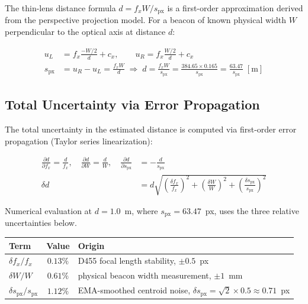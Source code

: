 The thin-lens distance formula $d = f_x W/s_{\text{px}}$ is a first-order approximation derived from the perspective projection model. For a beacon of known physical width $W$ perpendicular to the optical axis at distance $d$:

\begin{eqblock}
\begin{align}
u_L &= f_x \frac{-W/2}{d} + c_x, \qquad u_R = f_x \frac{W/2}{d} + c_x \\
s_{\text{px}} &= u_R - u_L = \frac{f_x W}{d} \;\Rightarrow\; d = \frac{f_x W}{s_{\text{px}}} = \frac{384.65 \times 0.165}{s_{\text{px}}} = \frac{63.47}{s_{\text{px}}} \; [\text{m}]
\end{align}
\end{eqblock}

\subsection{Total Uncertainty via Error Propagation}

The total uncertainty in the estimated distance is computed via first-order error propagation (Taylor series linearization):

\begin{eqblock}
\begin{align}
\frac{\partial d}{\partial f_x} = \frac{d}{f_x}, \quad
\frac{\partial d}{\partial W} = \frac{d}{W}, \quad
\frac{\partial d}{\partial s_{\text{px}}} &= -\frac{d}{s_{\text{px}}} \\
\delta d &= d\sqrt{\left(\frac{\delta f_x}{f_x}\right)^2 + \left(\frac{\delta W}{W}\right)^2 + \left(\frac{\delta s_{\text{px}}}{s_{\text{px}}}\right)^2}
\end{align}
\end{eqblock}

Numerical evaluation at $d=1.0$~m, where $s_{\text{px}}=63.47$~px, uses the
three relative uncertainties below.

\begin{center}
\small
\begin{tabular}{@{}lcl@{}}
\toprule
Term & Value & Origin \\
\midrule
$\delta f_x/f_x$ & $0.13\%$ & D455 focal length stability, $\pm0.5$~px \\
$\delta W/W$ & $0.61\%$ & physical beacon width measurement, $\pm1$~mm \\
$\delta s_{\text{px}}/s_{\text{px}}$ & $1.12\%$ &
  EMA-smoothed centroid noise, $\delta s_{\text{px}}=\sqrt2\times0.5\approx0.71$~px \\
\bottomrule
\end{tabular}
\end{center}

